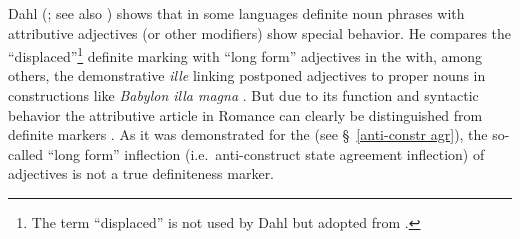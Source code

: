 {
Dahl (\citeyear[149–152]{dahl2003}; see also \citealt[122–123]{dahl2015a}) shows that in some languages definite noun phrases with attributive adjectives (or other modifiers) show special behavior. He compares the “displaced”\footnote{The term “displaced” is not used by Dahl but adopted from \citet[114–116]{melcuk2006}.} definite marking with “long form” adjectives in the  with, among others, the demonstrative \textit{ille} linking postponed adjectives to proper nouns in  constructions like \textit{Babylon illa magna} \cite[150]{dahl2003}. But due to its function and syntactic behavior the attributive article in Romance can clearly be distinguished from definite markers \citep[329]{gamillscheg1937}. As it was demonstrated for the  (see \S~\ref{anti-constr agr}), the so-called “long form” inflection (i.e.~anti-construct state agreement inflection) of adjectives is not a true definiteness marker.

}
